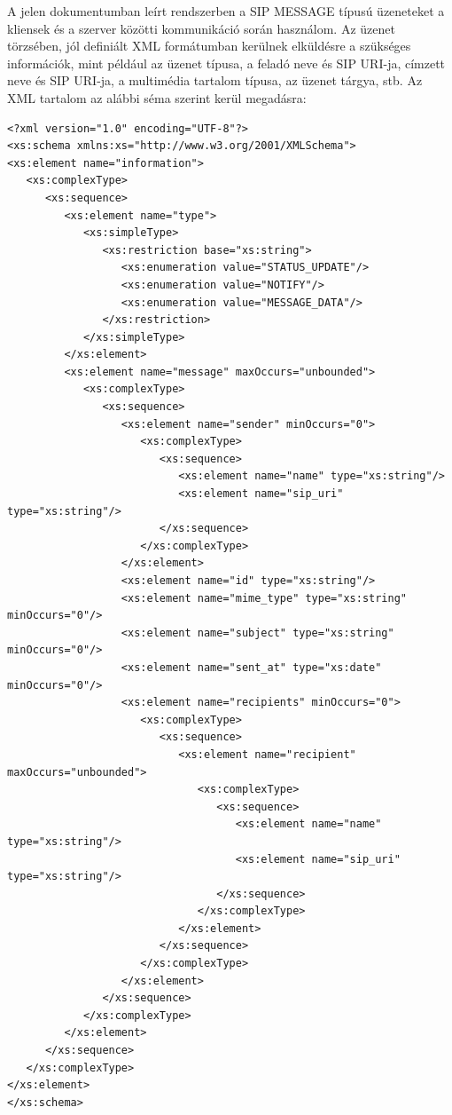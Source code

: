 A jelen dokumentumban leírt rendszerben a SIP MESSAGE típusú üzeneteket a kliensek és a szerver közötti kommunikáció során használom. Az üzenet törzsében, jól definiált XML formátumban kerülnek elküldésre a szükséges információk, mint például az üzenet típusa, a feladó neve és SIP URI-ja, címzett neve és SIP URI-ja, a multimédia tartalom típusa, az üzenet tárgya, stb. Az XML tartalom az alábbi séma szerint kerül megadásra:
\fontsize{10}{10}
\begin{verbatim}
<?xml version="1.0" encoding="UTF-8"?>
<xs:schema xmlns:xs="http://www.w3.org/2001/XMLSchema"> 
<xs:element name="information">
   <xs:complexType>
      <xs:sequence>
         <xs:element name="type">
            <xs:simpleType>
               <xs:restriction base="xs:string">                        
                  <xs:enumeration value="STATUS_UPDATE"/>
                  <xs:enumeration value="NOTIFY"/>
                  <xs:enumeration value="MESSAGE_DATA"/>
               </xs:restriction>
            </xs:simpleType>
         </xs:element>            
         <xs:element name="message" maxOccurs="unbounded">
            <xs:complexType>
               <xs:sequence>
                  <xs:element name="sender" minOccurs="0">
                     <xs:complexType>
                        <xs:sequence>
                           <xs:element name="name" type="xs:string"/>
                           <xs:element name="sip_uri" type="xs:string"/>
                        </xs:sequence>
                     </xs:complexType>
                  </xs:element>
                  <xs:element name="id" type="xs:string"/>
                  <xs:element name="mime_type" type="xs:string" minOccurs="0"/>
                  <xs:element name="subject" type="xs:string" minOccurs="0"/>
                  <xs:element name="sent_at" type="xs:date" minOccurs="0"/>
                  <xs:element name="recipients" minOccurs="0">
                     <xs:complexType>
                        <xs:sequence>
                           <xs:element name="recipient" maxOccurs="unbounded">
                              <xs:complexType>
                                 <xs:sequence>
                                    <xs:element name="name" type="xs:string"/>
                                    <xs:element name="sip_uri" type="xs:string"/>
                                 </xs:sequence>
                              </xs:complexType>
                           </xs:element>
                        </xs:sequence>                    
                     </xs:complexType>                
                  </xs:element>            
               </xs:sequence>
            </xs:complexType>
         </xs:element>            
      </xs:sequence>
   </xs:complexType>
</xs:element>
</xs:schema>
\end{verbatim}
\fontsize{12}{12} 

